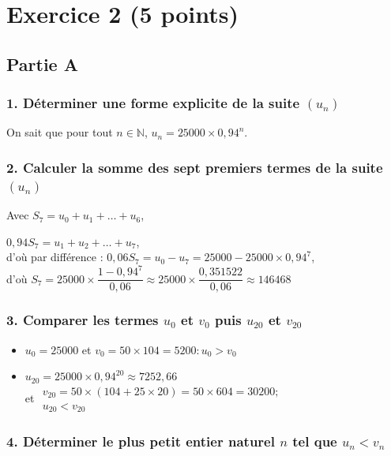 \section*{Exercice 2 (5 points)}
	
	\subsection*{Partie A}
	

	\subsubsection*{1. Déterminer une forme explicite de la suite $(u_n)$}
	
	On sait que pour tout $n \in \mathbb{N}$, $u_n = 25000 \times 0,94^n$.
	
	\subsubsection*{2. Calculer la somme des sept premiers termes de la suite $(u_n)$}
	
	Avec $S_7 = u_0 + u_1 + \dots + u_6$,
	
$
	0,94S_7 = u_1 + u_2 + \dots + u_7$, \\
	 d’où par différence : $ 0,06S_7 = u_0 - u_7 = 25000 - 25000 \times 0,94^7$,\\ 
	  d’où $	S_7 = 25000 \times \dfrac{1 - 0,94^7}{0,06} \approx 25000 \times \dfrac{0,351522}{0,06} \approx 146468$

	
	\subsubsection*{3. Comparer les termes $u_0$ et $v_0$ puis $u_{20}$ et $v_{20}$}
	
	\begin{itemize}
		\item $u_0 = 25000$ et $v_0 = 50 \times 104 = 5200 : u_0 > v_0$
		\item $u_{20} = 25000 \times 0,94^{20} \approx 7252,66$ \\
		et $\begin{gathered}v_{20} = 50 \times (104 + 25 \times 20) = 50 \times 604 = 30200;\\ u_{20} < v_{20}\end{gathered}$
	\end{itemize}
	
	\subsubsection*{4. Déterminer le plus petit entier naturel $n$ tel que $u_n < v_n$}
	
